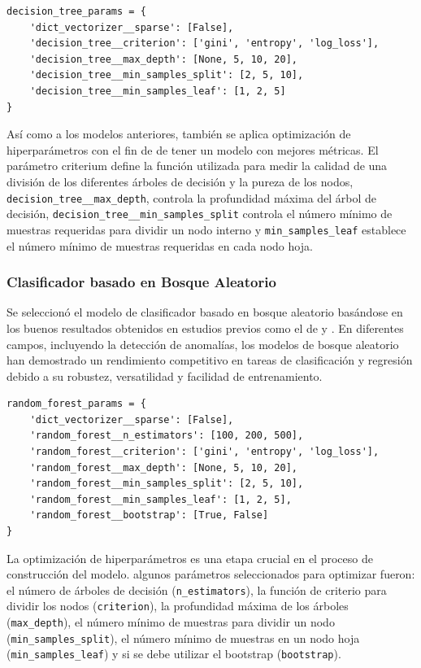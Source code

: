 \documentclass[11pt,a4paper,spanish]{book}
\numberwithin{equation}{chapter}
\numberwithin{figure}{chapter}
\begin{document}
\vspace{5mm}
\begin{lstlisting}
decision_tree_params = {
    'dict_vectorizer__sparse': [False],
    'decision_tree__criterion': ['gini', 'entropy', 'log_loss'],
    'decision_tree__max_depth': [None, 5, 10, 20],
    'decision_tree__min_samples_split': [2, 5, 10],
    'decision_tree__min_samples_leaf': [1, 2, 5]
}
\end{lstlisting}

Así como a los modelos anteriores, también se aplica optimización de hiperparámetros 
con el fin de  de tener un modelo con mejores métricas. El parámetro criterium define 
la función utilizada para medir la calidad de una división de los diferentes árboles de 
decisión y la pureza de los nodos, \lstinline|decision_tree__max_depth|, controla la 
profundidad máxima del árbol de decisión, \lstinline|decision_tree__min_samples_split|  
controla el número mínimo de muestras requeridas para dividir un nodo interno y 
\lstinline|min_samples_leaf| establece el número mínimo de muestras requeridas en 
cada nodo hoja. 


\subsubsection{Clasificador basado en Bosque Aleatorio}

Se seleccionó el modelo de clasificador basado en bosque aleatorio basándose en los 
buenos resultados obtenidos en estudios previos como el de \cite{canovas2017random} 
y \cite{yu2025tkeo}. En diferentes campos, incluyendo la detección de anomalías, 
los modelos de bosque aleatorio han demostrado un rendimiento competitivo en tareas 
de clasificación y regresión debido a su robustez, versatilidad y facilidad de 
entrenamiento. 


\vspace{5mm}
\begin{lstlisting}
random_forest_params = {
    'dict_vectorizer__sparse': [False],
    'random_forest__n_estimators': [100, 200, 500],   
    'random_forest__criterion': ['gini', 'entropy', 'log_loss'],
    'random_forest__max_depth': [None, 5, 10, 20],
    'random_forest__min_samples_split': [2, 5, 10],
    'random_forest__min_samples_leaf': [1, 2, 5],
    'random_forest__bootstrap': [True, False]
}
\end{lstlisting}

La optimización de hiperparámetros es una etapa crucial en el proceso de construcción 
del modelo. algunos parámetros seleccionados para optimizar fueron: el número de árboles 
de decisión (\lstinline|n_estimators|), la función de criterio para dividir los nodos 
(\lstinline|criterion|), la profundidad máxima de los árboles (\lstinline|max_depth|), 
el número mínimo de muestras para dividir un nodo (\lstinline|min_samples_split|), el 
número mínimo de muestras en un nodo hoja (\lstinline|min_samples_leaf|) y si se debe 
utilizar el bootstrap (\lstinline|bootstrap|). 
\end{document}
